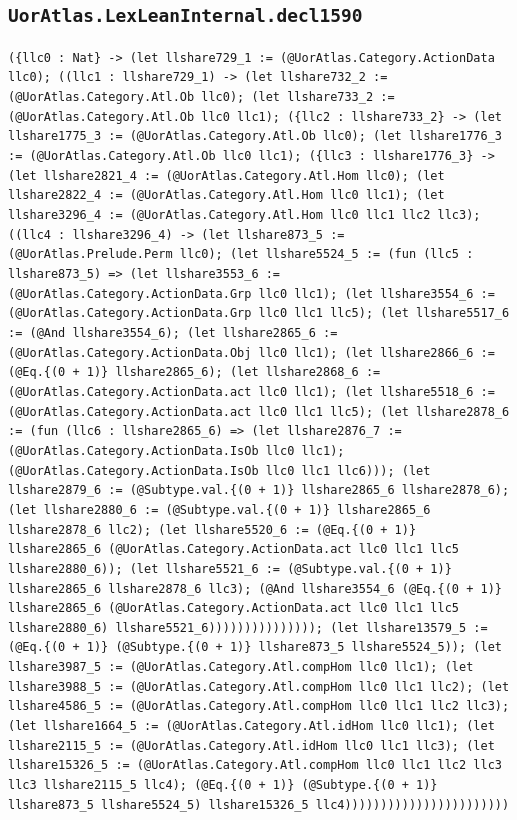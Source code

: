 \documentclass[11pt]{article}
\begin{document}
\subsection*{\texttt{UorAtlas.LexLeanInternal.decl1590}}
\noindent\texttt{(\{llc0 : Nat\} -> (let llshare729\_1 := (@UorAtlas.Category.ActionData llc0); ((llc1 : llshare729\_1) -> (let llshare732\_2 := (@UorAtlas.Category.Atl.Ob llc0); (let llshare733\_2 := (@UorAtlas.Category.Atl.Ob llc0 llc1); (\{llc2 : llshare733\_2\} -> (let llshare1775\_3 := (@UorAtlas.Category.Atl.Ob llc0); (let llshare1776\_3 := (@UorAtlas.Category.Atl.Ob llc0 llc1); (\{llc3 : llshare1776\_3\} -> (let llshare2821\_4 := (@UorAtlas.Category.Atl.Hom llc0); (let llshare2822\_4 := (@UorAtlas.Category.Atl.Hom llc0 llc1); (let llshare3296\_4 := (@UorAtlas.Category.Atl.Hom llc0 llc1 llc2 llc3); ((llc4 : llshare3296\_4) -> (let llshare873\_5 := (@UorAtlas.Prelude.Perm llc0); (let llshare5524\_5 := (fun (llc5 : llshare873\_5) => (let llshare3553\_6 := (@UorAtlas.Category.ActionData.Grp llc0 llc1); (let llshare3554\_6 := (@UorAtlas.Category.ActionData.Grp llc0 llc1 llc5); (let llshare5517\_6 := (@And llshare3554\_6); (let llshare2865\_6 := (@UorAtlas.Category.ActionData.Obj llc0 llc1); (let llshare2866\_6 := (@Eq.\{(0 + 1)\} llshare2865\_6); (let llshare2868\_6 := (@UorAtlas.Category.ActionData.act llc0 llc1); (let llshare5518\_6 := (@UorAtlas.Category.ActionData.act llc0 llc1 llc5); (let llshare2878\_6 := (fun (llc6 : llshare2865\_6) => (let llshare2876\_7 := (@UorAtlas.Category.ActionData.IsOb llc0 llc1); (@UorAtlas.Category.ActionData.IsOb llc0 llc1 llc6))); (let llshare2879\_6 := (@Subtype.val.\{(0 + 1)\} llshare2865\_6 llshare2878\_6); (let llshare2880\_6 := (@Subtype.val.\{(0 + 1)\} llshare2865\_6 llshare2878\_6 llc2); (let llshare5520\_6 := (@Eq.\{(0 + 1)\} llshare2865\_6 (@UorAtlas.Category.ActionData.act llc0 llc1 llc5 llshare2880\_6)); (let llshare5521\_6 := (@Subtype.val.\{(0 + 1)\} llshare2865\_6 llshare2878\_6 llc3); (@And llshare3554\_6 (@Eq.\{(0 + 1)\} llshare2865\_6 (@UorAtlas.Category.ActionData.act llc0 llc1 llc5 llshare2880\_6) llshare5521\_6))))))))))))))); (let llshare13579\_5 := (@Eq.\{(0 + 1)\} (@Subtype.\{(0 + 1)\} llshare873\_5 llshare5524\_5)); (let llshare3987\_5 := (@UorAtlas.Category.Atl.compHom llc0 llc1); (let llshare3988\_5 := (@UorAtlas.Category.Atl.compHom llc0 llc1 llc2); (let llshare4586\_5 := (@UorAtlas.Category.Atl.compHom llc0 llc1 llc2 llc3); (let llshare1664\_5 := (@UorAtlas.Category.Atl.idHom llc0 llc1); (let llshare2115\_5 := (@UorAtlas.Category.Atl.idHom llc0 llc1 llc3); (let llshare15326\_5 := (@UorAtlas.Category.Atl.compHom llc0 llc1 llc2 llc3 llc3 llshare2115\_5 llc4); (@Eq.\{(0 + 1)\} (@Subtype.\{(0 + 1)\} llshare873\_5 llshare5524\_5) llshare15326\_5 llc4)))))))))))))))))))))))}\par
\end{document}
